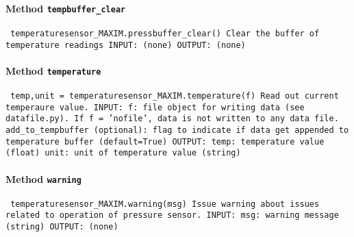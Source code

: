 \paragraph{Method \texttt{tempbuffer_clear}}
\vspace{1ex}
\texttt{\newline
temperaturesensor_MAXIM.pressbuffer_clear()\newline
\newline
Clear the buffer of temperature readings\newline
\newline
INPUT:\newline
(none)\newline
\newline
OUTPUT:\newline
(none)\newline
\newline
}

\paragraph{Method \texttt{temperature}}
\vspace{1ex}
\texttt{\newline
temp,unit = temperaturesensor_MAXIM.temperature(f)\newline
\newline
Read out current temperaure value.\newline
\newline
INPUT:\newline
f: file object for writing data (see datafile.py). If f = 'nofile', data is not written to any data file.\newline
add_to_tempbuffer (optional): flag to indicate if data get appended to temperature buffer (default=True)\newline
\newline
OUTPUT:\newline
temp: temperature value (float)\newline
unit: unit of temperature value (string)\newline
\newline
}

\paragraph{Method \texttt{warning}}
\vspace{1ex}
\texttt{\newline
temperaturesensor_MAXIM.warning(msg)\newline
\newline
Issue warning about issues related to operation of pressure sensor.\newline
\newline
INPUT:\newline
msg: warning message (string)\newline
\newline
OUTPUT:\newline
(none)\newline
\newline
}

